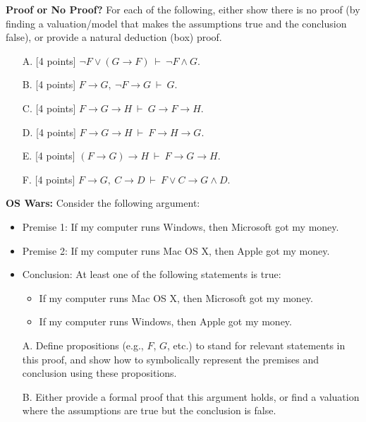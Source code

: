 \documentclass[12pt,letterpaper,boxed,cm]{hmcpset}
\newcommand{\pn}[1]{\left( #1 \right)}
\newcommand{\ra}[0]{\rightarrow}
\newcommand{\cp}[0]{~\vdash~}
\begin{document}
\begin{solution}
    \vfill
\end{solution}
\newpage

\begin{problem}[3]
    [24 points] \textbf{Proof or No Proof?} For each of the following, either show there is no proof (by finding a valuation/model that makes the assumptions true and the conclusion false), or provide a natural deduction (box) proof.
    \begin{enumerate}
        \item [A.] [4 points] $\neg F\lor\pn{G\ra F}\cp\neg F\land G.$
        \item [B.] [4 points] $F \ra G,~\neg F\ra G \cp G.$
        \item [C.] [4 points] $F \ra G \ra H \cp G \ra F \ra H.$
        \item [D.] [4 points] $F \ra G \ra H \cp F \ra H \ra G.$
        \item [E.] [4 points] $\pn{F \ra G} \ra H \cp F \ra G \ra H.$
        \item [F.] [4 points] $F \ra G,~C \ra D \cp F \lor C \ra G \land D.$
    \end{enumerate}
\end{problem}

\begin{solution}
    \vfill
\end{solution}
\newpage

\begin{problem}[4]
    [9 points] \textbf{OS Wars:} Consider the following argument:
    \begin{itemize}
        \item Premise 1: If my computer runs Windows, then Microsoft got my money.
        \item Premise 2: If my computer runs Mac OS X, then Apple got my money.
        \item Conclusion: At least one of the following statements is true:
        \begin{itemize}
            \item If my computer runs Mac OS X, then Microsoft got my money.
            \item If my computer runs Windows, then Apple got my money.
        \end{itemize}
    \end{itemize}
    \begin{enumerate}
        \item [A.] Define propositions (e.g., $F$, $G$, etc.) to stand for relevant statements in this proof, and show how to symbolically represent the premises and conclusion using these propositions.
        \item [B.] Either provide a formal proof that this argument holds, or find a valuation where the assumptions are true but the conclusion is false.
    \end{enumerate}
\end{problem}
\end{document}
